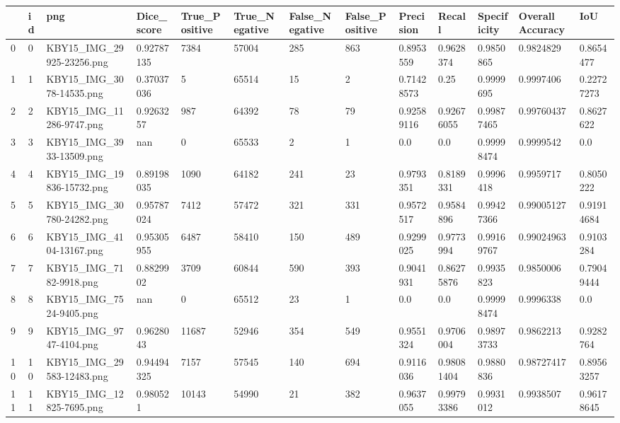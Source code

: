 \documentclass[11pt, a4paper, twoside]{report}
\begin{document}
\begin{longtable}[c]{@{}lllllllllllll@{}}
\toprule
 & id & png & Dice\_score & True\_Positive & True\_Negative & False\_Negative & False\_Positive & Precision & Recall & Specificity & Overall Accuracy & IoU \\* \midrule
\endhead
%
\bottomrule
\endfoot
%
\endlastfoot
%
0 & 0 & KBY15\_IMG\_29925-23256.png & 0.92787135 & 7384 & 57004 & 285 & 863 & 0.8953559 & 0.9628374 & 0.9850865 & 0.9824829 & 0.8654477 \\
1 & 1 & KBY15\_IMG\_3078-14535.png & 0.37037036 & 5 & 65514 & 15 & 2 & 0.71428573 & 0.25 & 0.9999695 & 0.9997406 & 0.22727273 \\
2 & 2 & KBY15\_IMG\_11286-9747.png & 0.9263257 & 987 & 64392 & 78 & 79 & 0.92589116 & 0.92676055 & 0.99877465 & 0.99760437 & 0.8627622 \\
3 & 3 & KBY15\_IMG\_3933-13509.png & nan & 0 & 65533 & 2 & 1 & 0.0 & 0.0 & 0.99998474 & 0.9999542 & 0.0 \\
4 & 4 & KBY15\_IMG\_19836-15732.png & 0.89198035 & 1090 & 64182 & 241 & 23 & 0.9793351 & 0.8189331 & 0.9996418 & 0.9959717 & 0.8050222 \\
5 & 5 & KBY15\_IMG\_30780-24282.png & 0.95787024 & 7412 & 57472 & 321 & 331 & 0.9572517 & 0.9584896 & 0.99427366 & 0.99005127 & 0.91914684 \\
6 & 6 & KBY15\_IMG\_4104-13167.png & 0.95305955 & 6487 & 58410 & 150 & 489 & 0.9299025 & 0.9773994 & 0.99169767 & 0.99024963 & 0.9103284 \\
7 & 7 & KBY15\_IMG\_7182-9918.png & 0.8829902 & 3709 & 60844 & 590 & 393 & 0.9041931 & 0.86275876 & 0.9935823 & 0.9850006 & 0.79049444 \\
8 & 8 & KBY15\_IMG\_7524-9405.png & nan & 0 & 65512 & 23 & 1 & 0.0 & 0.0 & 0.99998474 & 0.9996338 & 0.0 \\
9 & 9 & KBY15\_IMG\_9747-4104.png & 0.9628043 & 11687 & 52946 & 354 & 549 & 0.9551324 & 0.9706004 & 0.98973733 & 0.9862213 & 0.9282764 \\
10 & 10 & KBY15\_IMG\_29583-12483.png & 0.94494325 & 7157 & 57545 & 140 & 694 & 0.9116036 & 0.98081404 & 0.9880836 & 0.98727417 & 0.89563257 \\
11 & 11 & KBY15\_IMG\_12825-7695.png & 0.980521 & 10143 & 54990 & 21 & 382 & 0.9637055 & 0.99793386 & 0.9931012 & 0.9938507 & 0.96178645 \\

\end{longtable}
\end{document}
